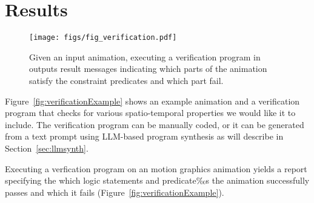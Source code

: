 \section{Results}
\begin{figure*}[t]
    \centering
    \texttt{[image: figs/fig\_verification.pdf]}
    \caption{Given an input animation, executing a verification program in \dslname{} outputs result messages indicating which parts of the animation satisfy the constraint predicates and which part fail. }
    \label{fig:verification}
\end{figure*}

%
Figure~\ref{fig:verificationExample} shows an example animation and a 
\dslname{} verification program that checks for various
spatio-temporal properties we would like it to
include.
%
The verification program can be manually coded, or it can be generated from a text prompt using
LLM-based program synthesis as will describe in Section~\ref{sec:llmsynth}.

%
Executing a \dslname{} verfication program on an motion graphics animation yields a report specifying
the which logic statements and predicate‰s the animation successfully passes and which it fails (Figure~\ref{fig:verificationExample}).




